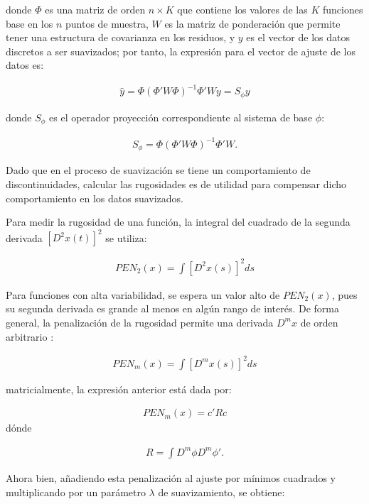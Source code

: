 \documentclass[
]{book}
\begin{document}
donde \(\Phi\) es una matriz de orden \(n \times K\) que contiene los valores de las \(K\) funciones base en los \(n\) puntos de muestra, \(W\) es la matriz de ponderación que permite tener una estructura de covarianza en los residuos, y \(y\) es el vector de los datos discretos a ser suavizados; por tanto, la expresión para el vector de ajuste de los datos es:

\begin{align}
    \hat{y}=\Phi(\Phi'W\Phi)^{-1} \Phi'Wy=S_\phi y
\end{align}

donde \(S_\phi\) es el operador proyección correspondiente al sistema de base \(\phi\):

\begin{align*}
    S_\phi=\Phi(\Phi'W\Phi)^{-1} \Phi'W.
\end{align*}

Dado que en el proceso de suavización se tiene un comportamiento de discontinuidades, calcular las rugosidades es de utilidad para compensar dicho comportamiento en los datos suavizados.

Para medir la rugosidad de una función, la integral del cuadrado de la segunda derivada \([D^2x(t)]^2\) se utiliza:

\begin{align*}
    PEN_2(x)=\int[D^2x(s)]^2ds
\end{align*}

Para funciones con alta variabilidad, se espera un valor alto de \(PEN_2(x)\), pues su segunda derivada es grande al menos en algún rango de interés. De forma general, la penalización de la rugosidad permite una derivada \(D^mx\) de orden arbitrario \citep{ramsay}:

\begin{align*}
    PEN_m(x)=\int[D^mx(s)]^2ds
\end{align*}

matricialmente, la expresión anterior está dada por:

\begin{align*}
    PEN_m(x)=c'Rc
 \end{align*} dónde

\begin{align*}
    R=\int D^m \phi D^m\phi'.
\end{align*}

Ahora bien, añadiendo esta penalización al ajuste por mínimos cuadrados y multiplicando por un parámetro \(\lambda\) de suavizamiento, se obtiene:
\end{document}
